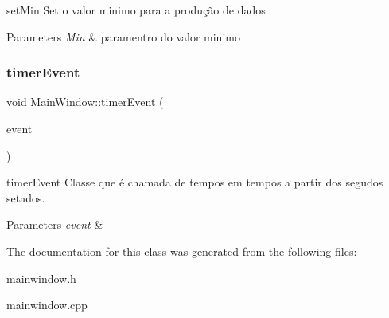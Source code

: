 set\+Min Set o valor minimo para a produção de dados 


\begin{DoxyParams}{Parameters}
{\em Min} & paramentro do valor minimo \\
\hline
\end{DoxyParams}
\mbox{\label{class_main_window_aaa425b1554af3c1f58cc70b4815082ae}} 
\subsubsection{\texorpdfstring{timer\+Event}{timerEvent}}
{\footnotesize\ttfamily void Main\+Window\+::timer\+Event (\begin{DoxyParamCaption}\item[{Q\+Timer\+Event $\ast$}]{event }\end{DoxyParamCaption})\hspace{0.3cm}{\ttfamily [slot]}}



timer\+Event Classe que é chamada de tempos em tempos a partir dos segudos setados. 


\begin{DoxyParams}{Parameters}
{\em event} & \\
\hline
\end{DoxyParams}


The documentation for this class was generated from the following files\+:\begin{DoxyCompactItemize}
\item 
mainwindow.\+h\item 
mainwindow.\+cpp\end{DoxyCompactItemize}
